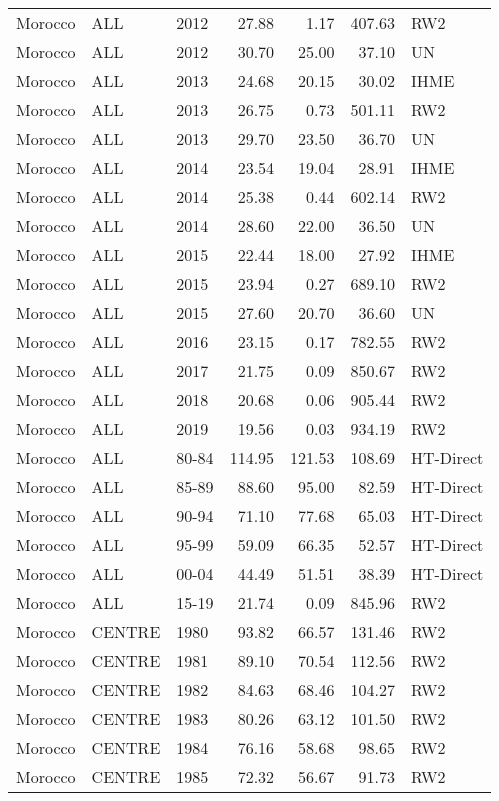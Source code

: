 \begin{longtable}{lllrrrl}
  Morocco & ALL & 2012 & 27.88 & 1.17 & 407.63 & RW2 \\ 
  Morocco & ALL & 2012 & 30.70 & 25.00 & 37.10 & UN \\ 
  Morocco & ALL & 2013 & 24.68 & 20.15 & 30.02 & IHME \\ 
  Morocco & ALL & 2013 & 26.75 & 0.73 & 501.11 & RW2 \\ 
  Morocco & ALL & 2013 & 29.70 & 23.50 & 36.70 & UN \\ 
  Morocco & ALL & 2014 & 23.54 & 19.04 & 28.91 & IHME \\ 
  Morocco & ALL & 2014 & 25.38 & 0.44 & 602.14 & RW2 \\ 
  Morocco & ALL & 2014 & 28.60 & 22.00 & 36.50 & UN \\ 
  Morocco & ALL & 2015 & 22.44 & 18.00 & 27.92 & IHME \\ 
  Morocco & ALL & 2015 & 23.94 & 0.27 & 689.10 & RW2 \\ 
  Morocco & ALL & 2015 & 27.60 & 20.70 & 36.60 & UN \\ 
  Morocco & ALL & 2016 & 23.15 & 0.17 & 782.55 & RW2 \\ 
  Morocco & ALL & 2017 & 21.75 & 0.09 & 850.67 & RW2 \\ 
  Morocco & ALL & 2018 & 20.68 & 0.06 & 905.44 & RW2 \\ 
  Morocco & ALL & 2019 & 19.56 & 0.03 & 934.19 & RW2 \\ 
  Morocco & ALL & 80-84 & 114.95 & 121.53 & 108.69 & HT-Direct \\ 
  Morocco & ALL & 85-89 & 88.60 & 95.00 & 82.59 & HT-Direct \\ 
  Morocco & ALL & 90-94 & 71.10 & 77.68 & 65.03 & HT-Direct \\ 
  Morocco & ALL & 95-99 & 59.09 & 66.35 & 52.57 & HT-Direct \\ 
  Morocco & ALL & 00-04 & 44.49 & 51.51 & 38.39 & HT-Direct \\ 
  Morocco & ALL & 15-19 & 21.74 & 0.09 & 845.96 & RW2 \\ 
  Morocco & CENTRE & 1980 & 93.82 & 66.57 & 131.46 & RW2 \\ 
  Morocco & CENTRE & 1981 & 89.10 & 70.54 & 112.56 & RW2 \\ 
  Morocco & CENTRE & 1982 & 84.63 & 68.46 & 104.27 & RW2 \\ 
  Morocco & CENTRE & 1983 & 80.26 & 63.12 & 101.50 & RW2 \\ 
  Morocco & CENTRE & 1984 & 76.16 & 58.68 & 98.65 & RW2 \\ 
  Morocco & CENTRE & 1985 & 72.32 & 56.67 & 91.73 & RW2 \\ 

\end{longtable}
